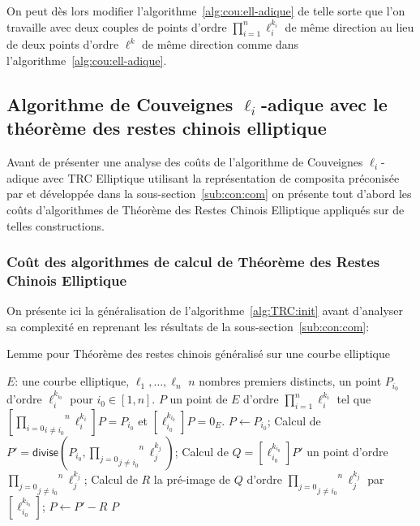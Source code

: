 \documentclass[10pt,a4paper]{book}
\theoremstyle{plain}
\theoremstyle{definition}
\theoremstyle{definition}
\theoremstyle{definition}
\theoremstyle{definition}
\theoremstyle{remark}
\theoremstyle{remark}
\theoremstyle{definition}
\begin{document}
 On peut dès lors modifier l'algorithme~\ref{alg:cou:ell-adique} de telle sorte
 que l'on travaille avec deux couples de points d'ordre 
 $\prod_{i=1}^n\ell_i^{k_i}$ de même direction au lieu de deux points d'ordre
 $\ell^k$ de même direction comme dans l'algorithme~\ref{alg:cou:ell-adique}.

\subsection{Algorithme de Couveignes $\ell_i$-adique avec le théorème des restes chinois elliptique}

Avant de présenter une analyse des coûts de l'algorithme de Couveignes 
$\ell_i$-adique avec TRC Elliptique utilisant la représentation de composita 
préconisée par \cite{DeFeoDoliskaniSchost14} et développée dans la 
sous-section~\ref{sub:con:com} on présente tout d'abord les coûts d'algorithmes
de Théorème des Restes Chinois Elliptique appliqués sur de telles constructions.

\subsubsection{Coût des algorithmes de calcul de Théorème des Restes Chinois Elliptique}

On présente ici la généralisation de l'algorithme~\ref{alg:TRC:init} avant 
d'analyser sa complexité en reprenant les résultats de la 
sous-section~\ref{sub:con:com}: 


\begin{algorithm}
\caption{\label{alg:TRC:init:gen}Lemme pour Théorème des restes chinois généralisé sur une courbe elliptique }
\begin{algorithmic}[1]
\REQUIRE $E$: une courbe elliptique, $\ell_1, \dots, \ell_n$ $n$ nombres premiers distincts, un point $P_{i_0}$ d'ordre $\ell_i^{k_{i_0}}$ pour $i_0 \in [1,n]$.
\ENSURE $P$ un point de $E$ d'ordre $\prod_{i=1}^n \ell_i^{k_i}$  tel que $[\overset{n}{\underset{i \neq i_0}{\underset{i = 0}{\prod}}}\ell_i^{k_i} ]P=P_{i_0}$ et $[\ell_{i_0}^{k_{i_0}}]P=0_E$.
\STATE $P \leftarrow P_{i_0}$;
\STATE \label{alg:TRC:init:gen:div} Calcul de $P'=\mathsf{divise}(P_{i_0},\overset{n}{\underset{j \neq i_0}{\underset{j = 0}{\prod}}}\ell_j^{k_j})$;
\STATE \label{alg:TRC:init:gen:mul} Calcul de $Q=[\ell_{i_0}^{k_{i_0}}]P'$ un point d'ordre $\overset{n}{\underset{j \neq i_0}{\underset{j = 0}{\prod}}}\ell_j^{k_j}$;
\STATE \label{alg:TRC:init:gen:prim} Calcul de $R$ la pré-image de $Q$ d'ordre $\overset{n}{\underset{j \neq i_0}{\underset{j = 0}{\prod}}}\ell_j^{k_j}$ par $[\ell_{i_0}^{k_{i_0}}]$;
\STATE \label{alg:TRC:init:gen:add}$P \leftarrow P'-R$
\RETURN $P$
\end{algorithmic}
\end{algorithm}
\end{document}
